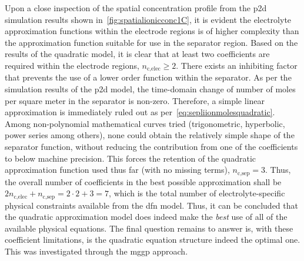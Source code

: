 Upon a close inspection of the  spatial concentration profile from the \gls{p2d}
simulation  results shown  in~\cref{fig:spatialionicconc1C}, it  is evident  the
electrolyte approximation  functions within the  electrode regions is  of higher
complexity than  the approximation  function suitable for  use in  the separator
region. Based on the  results of the quadratic model, it is  clear that at least
two coefficients  are required within the  electrode regions, $n_{\text{c,elec}}
\ge  2$.  There  exists  an  inhibiting  factor  that  prevents  the  use  of  a
lower  order  function within  the  separator.  As  per the  simulation  results
of  the  \gls{p2d}  model,  the  time-domain  change  of  number  of  moles  per
square  meter  in  the  separator   is  non-zero.  Therefore,  a  simple  linear
approximation is immediately  ruled out as per~\cref{eq:sepliionmolesquadratic}.
Among non-polynomial mathematical curves tried (trigonometric, hyperbolic, power
series  among  others),  none  could  obtain  the  relatively  simple  shape  of
the  separator function,  without  reducing  the contribution  from  one of  the
coefficients  to below  machine  precision.  This forces  the  retention of  the
quadratic approximation  function used thus  far (with no missing  terms), \ie{}
$n_\text{c,sep}  = 3$.  Thus, the  overall number  of coefficients  in the  best
possible approximation shall be $2  n_\text{c,elec} + n_\text{c,sep} = 2\cdot2 +
3 = 7$,  which is the total number of  electrolyte-specific physical constraints
available from the \gls{dfn} model. Thus, it can be concluded that the quadratic
approximation model does indeed make the \emph{best} use of all of the available
physical  equations.  The  final  question  remains to  answer  is,  with  these
coefficient limitations, is the quadratic  equation structure indeed the optimal
one. This was investigated through the \gls{mggp} approach.

